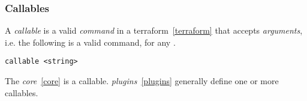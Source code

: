 \subsubsection{Callables}
\label{concepts_callables}

A \emph{callable} is a valid \emph{command} in a terraform~\ref{terraform} that accepts \emph{arguments}, i.e. the following is a valid command, for any .

\begin{verbatim}
callable <string>
\end{verbatim}

The \emph{core}~\ref{core} is a callable. \emph{plugins}~\ref{plugins} generally define one or more callables.